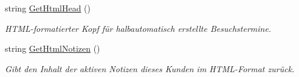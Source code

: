 \begin{DoxyCompactItemize}
\item 
string \hyperlink{class_products_1_1_model_1_1_entities_1_1_kunde_a3f4cb4cfbbaa86b5032980b3ecda01cb}{Get\+Html\+Head} ()
\begin{DoxyCompactList}\small\item\em H\+T\+M\+L-\/formatierter Kopf für halbautomatisch erstellte Besuchstermine. \end{DoxyCompactList}\item 
string \hyperlink{class_products_1_1_model_1_1_entities_1_1_kunde_a57905275c3581b8d085de200bdddcd27}{Get\+Html\+Notizen} ()
\begin{DoxyCompactList}\small\item\em Gibt den Inhalt der aktiven Notizen dieses Kunden im H\+T\+M\+L-\/\+Format zurück. \end{DoxyCompactList}\end{DoxyCompactItemize}

